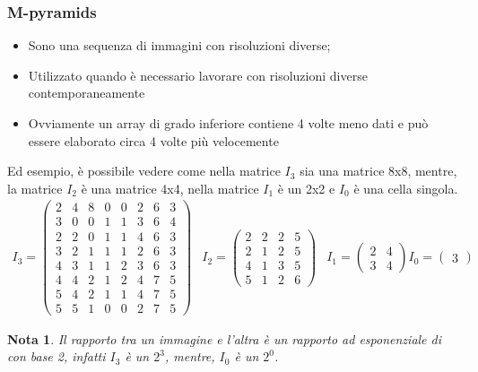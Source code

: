 \documentclass{report}
\newtheorem{nota}{Nota}[section]
\begin{document}
\subsubsection{M-pyramids}
\label{sec:mpyram}
\begin{itemize}
\item Sono una sequenza di immagini con risoluzioni diverse;
\item Utilizzato quando è necessario lavorare con risoluzioni diverse
  contemporaneamente
\item Ovviamente un array di grado inferiore contiene 4 volte meno dati
  e può essere elaborato circa 4 volte più velocemente
\end{itemize}
Ed esempio, è possibile vedere come nella matrice $I_3$ sia una matrice
8x8, mentre, la matrice $I_2$ è una matrice 4x4, nella matrice $I_1$ è
un 2x2 e $I_0$ è una cella singola. 
\begin{eqnarray}
  \label{eq:mpyram}
  I_3=
  \begin{pmatrix}
    2 & 4 & 8 & 0 & 0 & 2 & 6 & 3\\
    3 & 0 & 0 & 1 & 1 & 3 & 6 & 4\\
    2 & 2 & 0 & 1 & 1 & 4 & 6 & 3\\
    3 & 2 & 1 & 1 & 1 & 2 & 6 & 3\\
    4 & 3 & 1 & 1 & 2 & 3 & 6 & 3\\
    4 & 4 & 2 & 1 & 2 & 4 & 7 & 5\\
    5 & 4 & 2 & 1 & 1 & 4 & 7 & 5\\
    5 & 5 & 1 & 0 & 0 & 2 & 7 & 5
  \end{pmatrix} &
  I_2=\begin{pmatrix}
    2 & 2 & 2 & 5\\
    2 & 1 & 2 & 5\\
    4 & 1 & 3 & 5\\
    5 & 1 & 2 & 6
  \end{pmatrix} & I_1=
  \begin{pmatrix}
    2 & 4\\
    3 & 4
  \end{pmatrix} I_0=
  \begin{pmatrix}
    3
  \end{pmatrix}
\end{eqnarray}
\begin{nota}
  Il rapporto tra un immagine e l'altra è un rapporto ad esponenziale di
  con base 2, infatti $I_3$ è un $2^3$, mentre, $I_0$ è un $2^0$. 
\end{nota}
\end{document}
